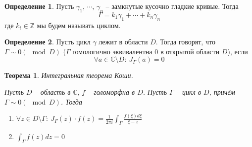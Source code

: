 \documentclass[a4paper,12pt]{article}
\theoremstyle{plain}
\newtheorem{theorem}{Теорема}[section]
\theoremstyle{definition}
\newtheorem{definition}{Определение}[section]
\theoremstyle{remark}
\begin{document}
\begin{definition}
	Пусть $\gamma_1,\, \cdots,\, \gamma_n$ -- замкнутые кусочно гладкие кривые. Тогда
	\[
		\Gamma = k_1\gamma_1 + \cdots + k_n\gamma_n
	\]
	где $k_i \in \mathbb{Z}$ мы будем называть циклом.
\end{definition}

\begin{definition}
	Пусть цикл $\gamma$ лежит в области $D$. Тогда говорят, что $\Gamma \sim 0 (\mod D)$ ($\Gamma$ гомологично эквивалентна 0 в открытой области $D$), если 
	\[
		\forall a \in \mathbb{C} \setminus D :\: J_\Gamma(a) = 0
	\]
\end{definition}

\begin{theorem}
	Интегральная теорема Коши.

	Пусть $D$ -- область в $\mathbb{C},\, f$ -- голоморфна в $D$. Пусть $\Gamma$ -- цикл в $D$, причём $\Gamma \sim 0 (\mod D)$. Тогда
	\begin{enumerate}
		\item $\forall z \in D \setminus \Gamma :\: J_\Gamma(z)\cdot f(z) = \frac{1}{2\pi i}\int_\Gamma \frac{f(\xi)d\xi}{\xi - z}$
		\item $\int_\Gamma f(z) dz = 0$
	\end{enumerate}
\end{theorem}
\end{document}
